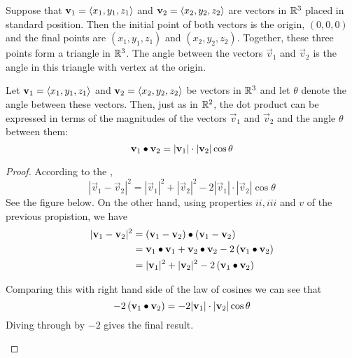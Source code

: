 \documentclass[handout]{ximera}
\begin{document}
Suppose that $\mathbf{v}_1=\left\langle x_1, y_1, z_1\right\rangle$ and $\mathbf{v}_2=\left\langle x_2, y_2, z_2\right\rangle$  are vectors in $\mathbb R^3$ placed in standard position.  
Then the initial point of both vectors is the origin, $(0,0,0)$ and the final points are
$(x_1, y_1, z_1)$ and $(x_2, y_2, z_2)$.  Together, these three points form a triangle in $\mathbb R^3$.  
The angle between the vectors $\vec{v}_1$ and $\vec{v}_2$ is the angle in this triangle with vertex at the origin.

\begin{proposition}
Let $\mathbf{v}_1 = \left\langle x_1, y_1, z_1\right\rangle$ and $\mathbf{v}_2 = \left\langle x_2, y_2, z_2\right\rangle$
be vectors in $\mathbb R^3$ and let $\theta$ denote the angle between these vectors.  
Then, just as in $\mathbb R^2$, the dot product can be expressed in terms of the 
magnitudes of the vectors $\vec{v}_1$ and $\vec{v}_2$ and the angle $\theta$ between them:
\[
\mathbf{v}_1\bullet\mathbf{v}_2 = |\mathbf{v}_1|\cdot |\mathbf{v}_2| \cos\theta
\]
\begin{proof}
According to the , 
\[
|\vec{v}_1 - \vec{v}_2|^2 = |\vec{v}_1|^2 + |\vec{v}_2|^2 - 2|\vec{v}_1|\cdot| \vec{v}_2|\cos \theta
\]
See the figure below. On the other hand, using properties $ii, iii$ and $v$ of the previous propistion, we have
\begin{align*}
|\mathbf{v}_1 - \mathbf{v}_2|^2 &= \left(\mathbf{v}_1 - \mathbf{v}_2\right)\bullet \left(\mathbf{v}_1 - \mathbf{v}_2\right)\\
                          &= \mathbf{v}_1 \bullet \mathbf{v}_1 + \mathbf{v}_2 \bullet \mathbf{v}_2 - 2\left(\mathbf{v}_1 \bullet \mathbf{v}_2\right)\\
                          &=|\mathbf{v}_1|^2 + |\mathbf{v}_2|^2 - 2\left(\mathbf{v}_1 \bullet \mathbf{v}_2\right)
\end{align*}

Comparing this with right hand side of the law of cosines we can see that
\[
- 2\left(\mathbf{v}_1 \bullet \mathbf{v}_2\right) = - 2|\mathbf{v}_1|\cdot| \mathbf{v}_2|\cos \theta
\]
Diving through by $-2$ gives the final result.

\begin{image}
\end{image}

\end{proof}

\end{proposition}
\end{document}
